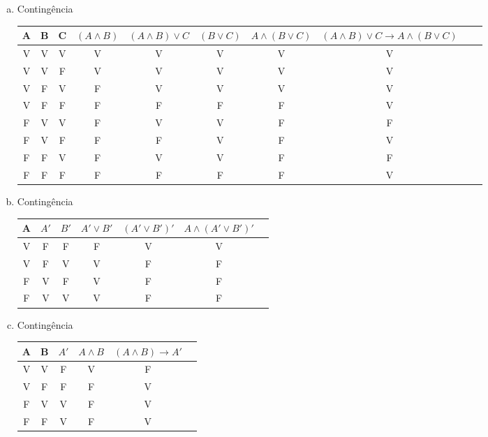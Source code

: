\documentclass[a4paper, 12pt, addpoints]{exam}
\begin{document}
\begin{questions}
\begin{resp}
\begin{enumerate}[a)]
      \item Contingência \\
      \begin{tabular}{|c|c|c|c|c|c|c|c|c|c|}
        \hline
        A & B & C & $(A \land B)$ & $(A \land B) \lor C$ & $(B \lor C)$ & $A \land (B \lor C)$ & $(A \land B) \lor C \rightarrow A \land (B \lor C)$ \\
        \hline
        V & V & V & V & V & V & V & V \\
        V & V & F & V & V & V & V & V \\
        V & F & V & F & V & V & V & V \\
        V & F & F & F & F & F & F & V \\
        F & V & V & F & V & V & F & F \\
        F & V & F & F & F & V & F & V \\
        F & F & V & F & V & V & F & F \\
        F & F & F & F & F & F & F & V \\
        \hline
      \end{tabular}
      
      \item Contingência \\
      \begin{tabular}{|c|c|c|c|c|c|c|}
        \hline
        A & $A'$ & $B'$ & $A' \lor B'$ & $(A' \lor B')'$ & $A \land (A' \lor B')'$ \\
        \hline
        V & F & F & F & V & V \\
        V & F & V & V & F & F \\
        F & V & F & V & F & F \\
        F & V & V & V & F & F \\
        \hline
      \end{tabular}

      \item Contingência \\
      \begin{tabular}{|c|c|c|c|c|c|}
        \hline
        A & B & $A'$ & $A \land B$ & $(A \land B) \rightarrow A'$ \\
        \hline
        V & V & F & V & F \\
        V & F & F & F & V \\
        F & V & V & F & V \\
        F & F & V & F & V \\
        \hline
      \end{tabular}


\end{enumerate}
\end{resp}
\end{questions}
\end{document}
